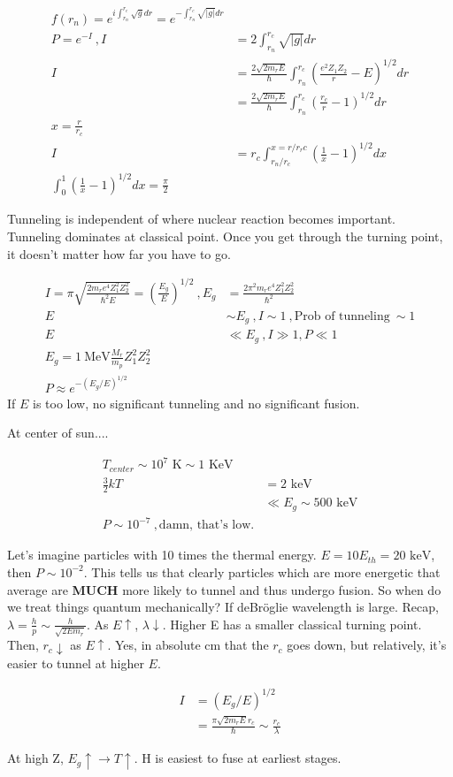 \begin{align}
f(r_n) = e^{i \int_{r_n}^{r_c} \sqrt{g} dr} = e^{-\int_{r_n}^{r_c} \sqrt{|g|}dr}\\
P = e^{-I}~, I &= 2\int_{r_n}^{r_c} \sqrt{|g|}dr\\
I &= \frac{2\sqrt{2m_rE}}{\hbar} \int_{r_n}^{r_c} \left(  \frac{e^2 Z_1 Z_2}{r} -E \right)^{1/2} dr\\
& = \frac{2\sqrt{2m_rE}}{\hbar}    \int_{r_n}^{r_c} \left( \frac{r_c}{r} -1 \right)^{1/2}dr\\
x = \frac{r}{r_c}\\
I & = r_c \int_{r_n/r_c}^{x=r/r_rc} \left(\frac{1}{x}-1\right)^{1/2}dx\\
\int_0^1 \left(\frac{1}{x}-1\right)^{1/2}dx = \frac{\pi}{2}
\end{align}

Tunneling is independent of where nuclear reaction becomes important. Tunneling dominates at classical point. Once you get through the turning point, it doesn't matter how far you have to go. 

\begin{align}
I = \pi \sqrt{ \frac{2m_r e^4 Z_1^2 Z_2^2}{\hbar^2 E} } = \left(\frac{E_g}{E} \right)^{1/2}~, E_g &= \frac{2\pi^2 m_r e^4 Z_1^2 Z_2^2}{\hbar^2}\\
E &\sim E_g~, I \sim 1~,\text{Prob of tunneling}~ \sim 1\\
E& \ll E_g~, I \gg 1, P \ll 1\\
E_g = 1 ~\text{MeV} \frac{M_r}{m_p}Z_1^2 Z_2^2\\
P \approx e^{-(E_g/E)^{1/2}}
\end{align}
If $E$ is too low, no significant tunneling and no significant fusion.

At center of sun....

\begin{align}
T_{center} \sim 10^7 \text{ K} \sim 1 \text{ KeV}\\
\frac{3}{2}kT &= 2\text{ keV}\\
& \ll E_g \sim 500 \text{ keV}\\
P \sim 10^{-7}~,\text{damn, that's low.}
\end{align} 

Let's imagine particles with 10 times the thermal energy. $E = 10 E_{th} = 20\text{ keV}$, then $P \sim 10^{-2}$. This tells us that clearly particles which are more energetic that average are \textbf{MUCH} more likely to tunnel and thus undergo fusion. So when do we treat things quantum mechanically? If deBr\"oglie wavelength is large. Recap, $\lambda = \frac{h}{p} \sim \frac{h}{\sqrt{2Em_r}}$. As $E \uparrow$, $\lambda \downarrow$. Higher E has a smaller classical turning point. Then, $r_c \downarrow$ as $E \uparrow$. Yes, in absolute cm that the $r_c$ goes down, but relatively, it's easier to tunnel at higher $E$. 

\begin{align}
I &= (E_g/E)^{1/2}\\
& = \frac{\pi \sqrt{2m_rE}r_c}{\hbar} \sim \frac{r_c}{\lambda}
\end{align}

At high Z, $E_g \uparrow \rightarrow T \uparrow$. H is easiest to fuse at earliest stages.
